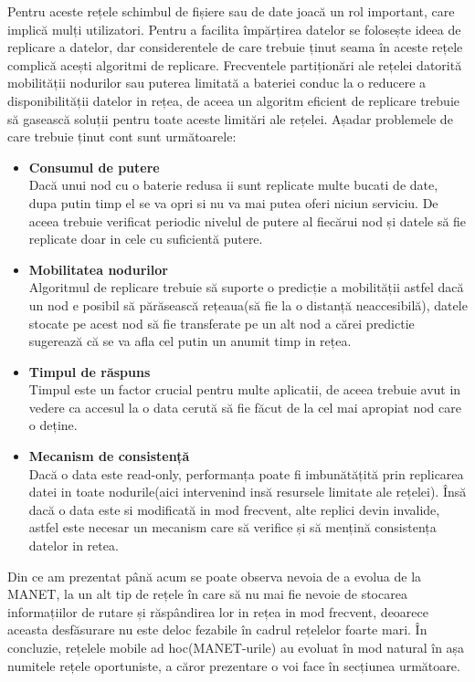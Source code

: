 \documentclass[12pt,a4paper]{report}
\begin{document}
Pentru aceste rețele schimbul de fișiere sau de date joacă un rol important, care implică mulți utilizatori. Pentru a facilita împărțirea datelor se folosește ideea de replicare a datelor\cite{CDRA}, dar considerentele de care trebuie ținut seama în aceste rețele complică acești algoritmi de replicare. Frecventele partiționări ale rețelei datorită mobilității nodurilor sau puterea limitată a bateriei conduc la o reducere a disponibilității datelor in rețea, de aceea un algoritm eficient de replicare trebuie să gasească soluții pentru toate aceste limitări ale rețelei. Așadar problemele de care trebuie ținut cont sunt următoarele:
\begin{itemize}
	\item\textbf{Consumul de putere} \hfill \\
	Dacă unui nod cu o baterie redusa ii sunt replicate multe bucati de date, dupa putin timp el se va opri si nu va mai putea oferi niciun serviciu. De aceea trebuie verificat periodic nivelul de putere al fiecărui nod și datele să fie replicate doar in cele cu suficientă putere.
	\item\textbf{Mobilitatea nodurilor} \hfill \\
	Algoritmul de replicare trebuie să suporte o predicție a mobilității astfel dacă un nod e posibil să părăsească rețeaua(să fie la o distanță neaccesibilă), datele stocate pe acest nod să fie transferate pe un alt nod a cărei predictie sugerează că se va afla cel putin un anumit timp in rețea.
	\item\textbf{Timpul de răspuns} \hfill \\
	Timpul este un factor crucial pentru multe aplicatii, de aceea trebuie avut in vedere ca accesul la o data cerută să fie făcut de la cel mai apropiat nod care o deține.
	\item\textbf{Mecanism de consistență} \hfill \\
	Dacă o data este read-only, performanța poate fi imbunătățită prin replicarea datei in toate nodurile(aici intervenind insă resursele limitate ale rețelei). Însă dacă o data este si modificată in mod frecvent, alte replici devin invalide, astfel este necesar un mecanism care să verifice și să mențină consistența datelor in retea.
\end{itemize}
Din ce am prezentat până acum se poate observa nevoia de a evolua de la MANET, la un alt tip de rețele în care să 
nu mai fie nevoie de stocarea informațiilor de rutare și răspândirea lor in rețea in mod frecvent, deoarece aceasta desfăsurare nu este deloc fezabile în cadrul rețelelor foarte mari. În concluzie, rețelele mobile ad hoc(MANET-urile) au evoluat în mod natural în așa numitele rețele oportuniste, a căror prezentare o voi face în secțiunea următoare.
\end{document}

